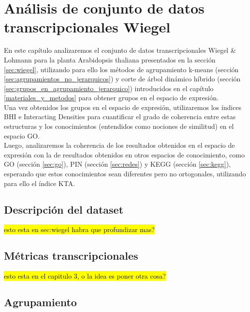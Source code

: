 \chapter{Análisis de conjunto de datos transcripcionales Wiegel}
En este capítulo analizaremos el conjunto de datos transcripcionales Wiegel \& Lohmann para la planta Arabidopsis thaliana presentados en la sección \ref{sec:wiegel}, utilizando para ello los métodos de agrupamiento k-means (sección \ref{sec:agrupamientos_no_jerarquicos}) y corte de árbol dinámico híbrido (sección \ref{sec:grupos_en_agrupamiento_jerarquico}) introducidos en el capítulo \ref{materiales_y_metodos} para obtener grupos en el espacio de expresión.\\
Una vez obtenidos los grupos en el espacio de expresión, utilizaremos los índices BHI e Interacting Densities para cuantificar el grado de coherencia entre estas estructuras y los conocimientos (entendidos como nociones de similitud) en el espacio GO.\\
Luego, analizaremos la coherencia de los resultados obtenidos en el espacio de expresión con la de resultados obtenidos en otros espacios de conocimiento, como GO (sección \ref{sec:go}), PIN  (sección \ref{sec:redes}) y KEGG (sección \ref{sec:kegg}), esperando que estos conocimientos sean diferentes pero no ortogonales, utilizando para ello el índice KTA. 
\section{Descripción del dataset}
\hl{esto esta en sec:wiegel habra que profundizar mas?}
\section{Métricas transcripcionales}
\hl{esto esta en el capitulo 3, o la idea es poner otra cosa?}
\section{Agrupamiento}

